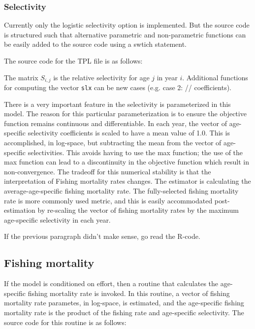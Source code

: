 \documentclass[12pt,letterpaper]{article}
\begin{document}
    \subsubsection{Selectivity} %
    \label{ssub:selectivity}
      Currently only the logistic selectivity option is implemented. But the source code is structured such that alternative parametric and non-parametric functions can be easily added to the source code using a swtich statement.

       The source code for the TPL file is as follows:
      

      The matrix $S_{i,j}$ is the relative selectivity for age $j$ in year $i$.  Additional functions for computing the vector \texttt{slx} can be new cases (e.g. case 2:  // coefficients).

      There is a very important feature in the selectivity is parameterized in this model.  The reason for this particular parameterization is to ensure the objective function remains continuous and differentiable.  In each year, the vector of age-specific selectivity coefficients is scaled to have a mean value of 1.0.  This is accomplished, in log-space, but subtracting the mean from the vector of age-specific selectivities.  This avoids having to use the max function; the use of the max function can lead to a discontinuity in the objective function which result in non-convergence.  The tradeoff for this numerical stability is that the interpretation of Fishing mortality rates changes.  The estimator is calculating the average-age-specific fishing mortality rate.  The fully-selected fishing mortality rate is more commonly used metric, and this is easily accommodated post-estimation by re-scaling the vector of fishing mortality rates by the maximum age-specific selectivity in each year. 

      If the previous paragraph didn't make sense, go read the R-code.


  \subsection{Fishing mortality} %
  \label{sub:fishing_mortality}
  If the model is conditioned on effort, then a routine that calculates the age-specific fishing mortality rate is invoked.  In this routine, a vector of fishing mortality rate parametes, in log-space, is estimated, and the age-specific fishing mortality rate is the product of the fishing rate and age-specific selectivity.  The source code for this routine is as follows:
  
\end{document}
